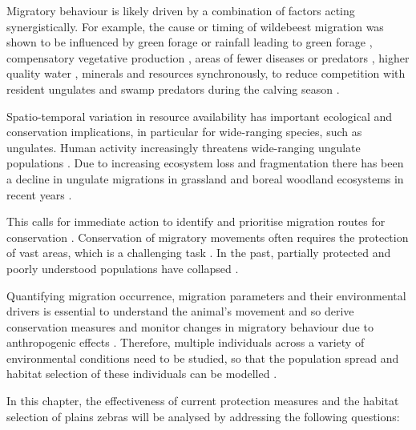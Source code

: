\documentclass[12pt,a4paper, twoside, english]{article}
\begin{document}
Migratory behaviour is likely driven by a combination of factors acting synergistically. For example, the cause or timing of wildebeest migration was shown to be influenced by green forage \citep{Boone2006} or rainfall leading to green forage \citep{Talbot1963}, compensatory vegetative production \citep{McNaughton1976}, areas of fewer diseases or predators \citep{Darling1960, Fryxell1988}, higher quality water \citep{Gereta1998}, minerals \citep{Kreulen1975} and resources synchronously, to reduce competition with resident ungulates and swamp predators during the calving season \citep{Estes1976}.

Spatio-temporal variation in resource availability has important ecological and conservation implications, in particular for wide-ranging species, such as ungulates. Human activity increasingly threatens wide-ranging ungulate populations \citep{Berger2004, Harris2009}. Due to increasing ecosystem loss and fragmentation there has been a decline in ungulate migrations in grassland and boreal woodland ecosystems in recent years \citep{Bartlam-Brooks2011, Bartlam-Brooks2013, Olson2010}. 

This calls for immediate action to identify and prioritise migration routes for conservation \citep{Sawyer2009}. Conservation of migratory movements often requires the protection of vast areas, which is a challenging task \citep{Thirgood2004}. 
In the past, partially protected and poorly understood populations have collapsed \citep{Bolger2008, Harris2009}. 

Quantifying migration occurrence, migration parameters and their environmental drivers is essential to understand the animal's movement and so derive conservation measures and monitor changes in migratory behaviour due to anthropogenic effects \citep{Berger2004, Bolger2008, Wilcove2008, Katzner2012, Bauer2014, Naidoo2014}. Therefore, multiple individuals across a variety of environmental conditions need to be studied, so that the population spread and habitat selection of these individuals can be modelled \citep{Avgar2013}.


In this chapter, the effectiveness of current protection measures and the habitat selection of plains zebras will be analysed by addressing the following questions:
\end{document}
